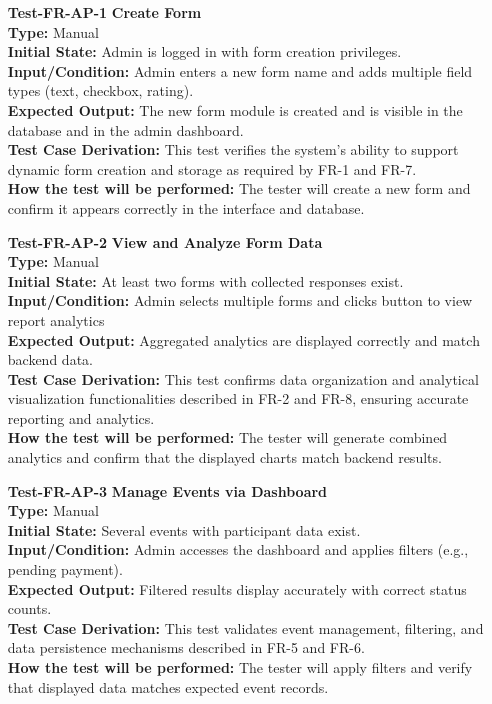 \documentclass[12pt, titlepage]{article}
\begin{document}
\begin{enumerate}

\item[\textbf{Test-FR-AP-1}] \textbf{Create Form}\\
\textbf{Type:} Manual\\
\textbf{Initial State:} Admin is logged in with form creation privileges.\\
\textbf{Input/Condition:} Admin enters a new form name and adds multiple field types (text, checkbox, rating).\\
\textbf{Expected Output:} The new form module is created and is visible in the database and in the admin dashboard.\\
\textbf{Test Case Derivation:} This test verifies the system’s ability to support dynamic form creation and storage as required by FR-1 and FR-7.\\
\textbf{How the test will be performed:} The tester will create a new form and confirm it appears correctly in the interface and database.\\[6pt]

\item[\textbf{Test-FR-AP-2}] \textbf{View and Analyze Form Data}\\
\textbf{Type:} Manual\\
\textbf{Initial State:} At least two forms with collected responses exist.\\
\textbf{Input/Condition:} Admin selects multiple forms and clicks button to view report analytics\\
\textbf{Expected Output:} Aggregated analytics are displayed correctly and match backend data.\\
\textbf{Test Case Derivation:} This test confirms data organization and analytical visualization functionalities described in FR-2 and FR-8, ensuring accurate reporting and analytics.\\
\textbf{How the test will be performed:} The tester will generate combined analytics and confirm that the displayed charts match backend results.\\[6pt]

\item[\textbf{Test-FR-AP-3}] \textbf{Manage Events via Dashboard}\\
\textbf{Type:} Manual\\
\textbf{Initial State:} Several events with participant data exist.\\
\textbf{Input/Condition:} Admin accesses the dashboard and applies filters (e.g., pending payment).\\
\textbf{Expected Output:} Filtered results display accurately with correct status counts.\\
\textbf{Test Case Derivation:} This test validates event management, filtering, and data persistence mechanisms described in FR-5 and FR-6.\\
\textbf{How the test will be performed:} The tester will apply filters and verify that displayed data matches expected event records.\\[6pt]


\end{enumerate}
\end{document}
